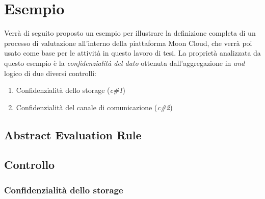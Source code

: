 \documentclass[../main.tex]{subfiles}
\begin{document}
\section{Esempio}

Verrà di seguito proposto un esempio per illustrare la definizione completa di un processo di valutazione all'interno della piattaforma Moon Cloud, che verrà poi usato come base per le attività in questo lavoro di tesi.
La proprietà analizzata da questo esempio è la \textit{confidenzialità del dato} ottenuta dall'aggregazione in \textit{and} logico di due diversi controlli:
\begin{enumerate}
    \item{Confidenzialità dello storage (\textit{c\#1})}
    \item{Confidenzialità del canale di comunicazione (\textit{c\#2})}
\end{enumerate}

\subsection{Abstract Evaluation Rule}



\subsection{Controllo}

\subsubsection{Confidenzialità dello storage}
\end{document}
